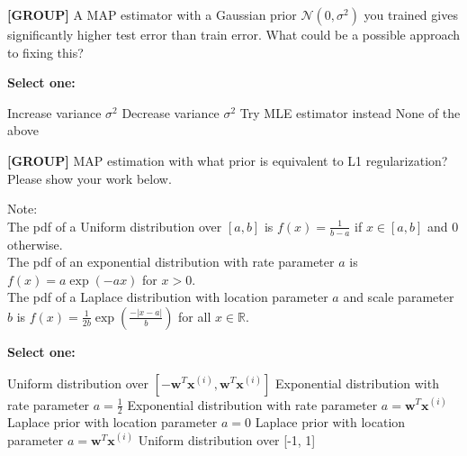 \documentclass[11pt,addpoints,answers]{exam}
\newcommand{\group}{\textbf{[GROUP]} }
\begin{document}
\begin{questions}
    \begin{your_solution}[title=Your answer,height=5cm,width=15cm]
    \end{your_solution}
    
    
    
    
    \question[2]\group A MAP estimator with a Gaussian prior $\mathcal{N}(0, \sigma^2)$ you trained gives significantly higher test error than train error. What could be a possible approach to fixing this? 

    \textbf{Select one:}
    \begin{checkboxes}
        \choice Increase variance $\sigma^2$
        \choice Decrease variance $\sigma^2$
        \choice Try MLE estimator instead
        \choice None of the above
    \end{checkboxes}
    

    
    \question[4]\group MAP estimation with what prior is equivalent to L1 regularization?  Please show your work below.

    Note:\\
    The pdf of a Uniform distribution over $[a,b]$ is $f(x) = \frac{1}{b-a}$ if $x \in [a,b]$ and 0 otherwise.\\
    The pdf of an exponential distribution with rate parameter $a$ is $f(x) = a \exp(-a x)$ for $x > 0$.\\
    The pdf of a Laplace distribution with location parameter $a$ and scale parameter $b$  is $f(x) = \frac{1}{2b} \exp \left( \frac{- |x - a| }{b} \right)$ for all $x \in \mathbb{R}$.
    

    \textbf{Select one:}
    \begin{checkboxes}
        \choice Uniform distribution over $[- \mathbf{w}^T\mathbf{x}^{(i)}, \mathbf{w}^T\mathbf{x}^{(i)} ]$
        \choice Exponential distribution with rate parameter $a = \frac{1}{2}$
        \choice Exponential distribution with rate parameter $a = \mathbf{w}^T \mathbf{x}^{(i)}$
        \choice Laplace prior with location parameter $a = 0$
        \choice Laplace prior with location parameter $a = \mathbf{w}^T \mathbf{x}^{(i)}$
        \choice Uniform distribution over [-1, 1]
    \end{checkboxes}
    
    
    \begin{your_solution}[title=Your answer,height=13cm,width=15cm]
    \end{your_solution}
    

\end{questions}
\end{document}
